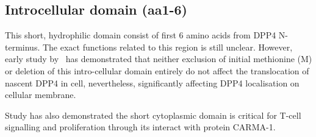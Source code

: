 \subsection{Introcellular domain (aa1-6)}

This short, hydrophilic domain consist of first 6 amino acids from DPP4 N-terminus. The exact functions related to this region is still unclear. However, early study by~\citet{Hong1990} has demonstrated that neither exclusion of initial methionine (M) or deletion of this intro-cellular domain entirely do not affect the translocation of nascent DPP4 in cell, nevertheless, significantly affecting DPP4 localisation on cellular membrane. 
\par
Study has also demonstrated the short cytoplasmic domain is critical for T-cell signalling and proliferation through its interact with protein CARMA-1. \cite{Ohnuma_2007}